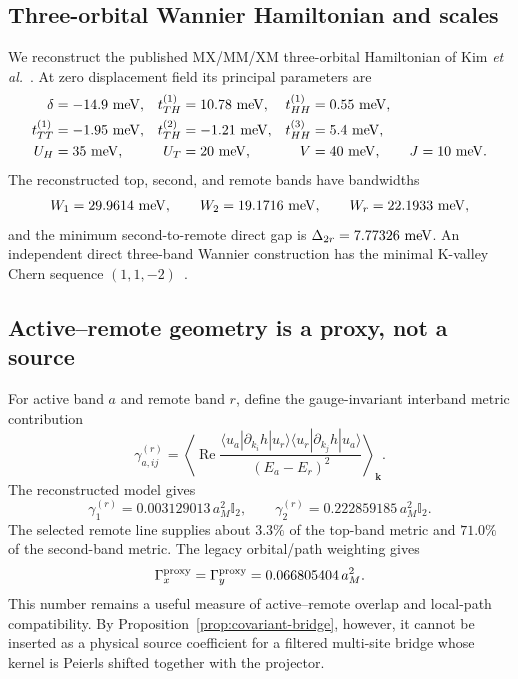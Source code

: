 \documentclass[11pt]{article}
\theoremstyle{remark}
\newcommand{\Id}{\mathbb I}
\newcommand{\bmk}{\bm k}
\begin{document}
\subsection{Three-orbital Wannier Hamiltonian and scales}

We reconstruct the published MX/MM/XM three-orbital Hamiltonian of Kim \emph{et al.}~\cite{kim2025}.  At zero displacement field its principal parameters are
\begin{equation}
\begin{aligned}
\delta&=-14.9~{\rm meV},&
 t_{TH}^{(1)}&=10.78~{\rm meV},&
 t_{HH}^{(1)}&=0.55~{\rm meV},\\
 t_{TT}^{(1)}&=-1.95~{\rm meV},&
 t_{TH}^{(2)}&=-1.21~{\rm meV},&
 t_{HH}^{(3)}&=5.4~{\rm meV},\\
 U_H&=35~{\rm meV},&
 U_T&=20~{\rm meV},&
 V&=40~{\rm meV},\qquad J=10~{\rm meV}.
\end{aligned}
\end{equation}
The reconstructed top, second, and remote bands have bandwidths
\begin{equation}
 W_1=29.9614~{\rm meV},\qquad
 W_2=19.1716~{\rm meV},\qquad
 W_r=22.1933~{\rm meV},
\end{equation}
and the minimum second-to-remote direct gap is $\Delta_{2r}=7.77326~{\rm meV}$.  An independent direct three-band Wannier construction has the minimal K-valley Chern sequence $(1,1,-2)$~\cite{tuo2025}.

\subsection{Active--remote geometry is a proxy, not a source}

For active band $a$ and remote band $r$, define the gauge-invariant interband metric contribution
\begin{equation}
 \gamma^{(r)}_{a,ij}
 =\left\langle\operatorname{Re}
 \frac{\langle u_a|\partial_{k_i}h|u_r\rangle
       \langle u_r|\partial_{k_j}h|u_a\rangle}
 {(E_a-E_r)^2}\right\rangle_{\bmk}.
\end{equation}
The reconstructed model gives
\begin{equation}
 \gamma_1^{(r)}=0.003129013\,a_M^2\Id_2,
 \qquad
 \gamma_2^{(r)}=0.222859185\,a_M^2\Id_2.
\end{equation}
The selected remote line supplies about $3.3\%$ of the top-band metric and $71.0\%$ of the second-band metric.  The legacy orbital/path weighting gives
\begin{equation}
 \Gamma_x^{\rm proxy}=\Gamma_y^{\rm proxy}=0.066805404\,a_M^2.
 \label{eq:material-Gamma-proxy}
\end{equation}
This number remains a useful measure of active--remote overlap and local-path compatibility.  By Proposition~\ref{prop:covariant-bridge}, however, it cannot be inserted as a physical source coefficient for a filtered multi-site bridge whose kernel is Peierls shifted together with the projector.
\end{document}
